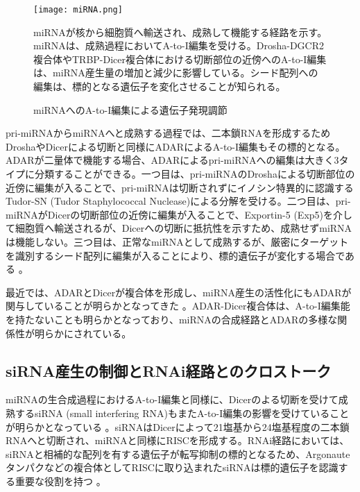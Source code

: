 \begin{figure}[!h]
	\begin{center}
		\texttt{[image: miRNA.png]}
	\end{center}
	\caption{miRNAへのA-to-I編集による遺伝子発現調節}
	\begin{flushleft}
		\small{miRNAが核から細胞質へ輸送され、成熟して機能する経路を示す。miRNAは、成熟過程においてA-to-I編集を受ける。Drosha-DGCR2複合体やTRBP-Dicer複合体における切断部位の近傍へのA-to-I編集は、miRNA産生量の増加と減少に影響している。シード配列への編集は、標的となる遺伝子を変化させることが知られる。}
	\end{flushleft}
	\label{fig:miRNA}
\end{figure}
pri-miRNAからmiRNAへと成熟する過程では、二本鎖RNAを形成するためDroshaやDicerによる切断と同様にADARによるA-to-I編集もその標的となる。ADARが二量体で機能する場合、ADARによるpri-miRNAへの編集は大きく3タイプに分類することができる。一つ目は、pri-miRNAのDroshaによる切断部位の近傍に編集が入ることで、pri-miRNAは切断されずにイノシン特異的に認識するTudor-SN (Tudor Staphylococcal
Nuclease)による分解を受ける。二つ目は、pri-miRNAがDicerの切断部位の近傍に編集が入ることで、Exportin-5 (Exp5)を介して細胞質へ輸送されるが、Dicerへの切断に抵抗性を示すため、成熟せずmiRNAは機能しない。三つ目は、正常なmiRNAとして成熟するが、厳密にターゲットを識別するシード配列に編集が入ることにより、標的遺伝子が変化する場合である \citep{Slotkin:2013aa}。
\par
最近では、ADARとDicerが複合体を形成し、miRNA産生の活性化にもADARが関与していることが明らかとなってきた \citep{OtaSakGup1304}。ADAR-Dicer複合体は、A-to-I編集能を持たないことも明らかとなっており、miRNAの合成経路とADARの多様な関係性が明らかにされている。

\subsection{siRNA産生の制御とRNAi経路とのクロストーク}
miRNAの生合成過程におけるA-to-I編集と同様に、Dicerのよる切断を受けて成熟するsiRNA (small interfering RNA)もまたA-to-I編集の影響を受けていることが明らかとなっている \citep{YanWanHow0502}。siRNAはDicerによって21塩基から24塩基程度の二本鎖RNAへと切断され、miRNAと同様にRISCを形成する。RNAi経路においては、siRNAと相補的な配列を有する遺伝子が転写抑制の標的となるため、Argonauteタンパクなどの複合体としてRISCに取り込まれたsiRNAは標的遺伝子を認識する重要な役割を持つ \citep{Fil0507}。

